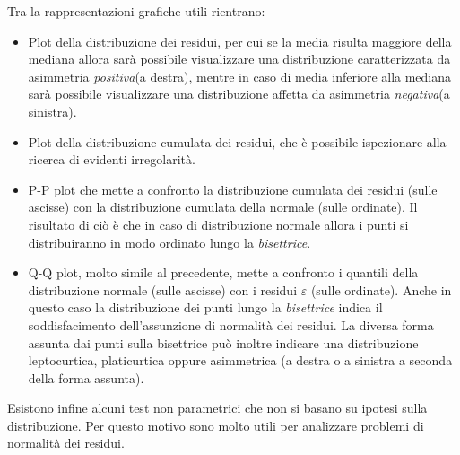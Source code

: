 \documentclass[a4page, 11pt]{article} %
\begin{document}
Tra la rappresentazioni grafiche utili rientrano:
\begin{itemize}[noitemsep]
\item Plot della distribuzione dei residui, per cui se la media risulta maggiore della mediana allora sarà possibile visualizzare una distribuzione caratterizzata da asimmetria \textit{positiva}(a destra), mentre in caso di media inferiore alla mediana sarà possibile visualizzare una distribuzione affetta da asimmetria \textit{negativa}(a sinistra).
\item Plot della distribuzione cumulata dei residui, che è possibile ispezionare alla ricerca di evidenti irregolarità.
\item P-P plot che mette a confronto la distribuzione cumulata dei residui (sulle ascisse) con la distribuzione cumulata della normale (sulle ordinate). Il risultato di ciò è che in caso di distribuzione normale allora i punti si distribuiranno in modo ordinato lungo la \textit{bisettrice}. 
\item Q-Q plot, molto simile al precedente, mette a confronto i quantili della distribuzione normale (sulle ascisse) con i residui $\varepsilon$ (sulle ordinate). Anche in questo caso la distribuzione dei punti lungo la \textit{bisettrice} indica il soddisfacimento dell'assunzione di normalità dei residui. La diversa forma assunta dai punti sulla bisettrice può inoltre indicare una distribuzione leptocurtica, platicurtica oppure asimmetrica (a destra o a sinistra a seconda della forma assunta).
\end{itemize}
Esistono infine alcuni test non parametrici che non si basano su ipotesi sulla distribuzione. Per questo motivo sono molto utili per analizzare problemi di normalità dei residui.
\end{document}
